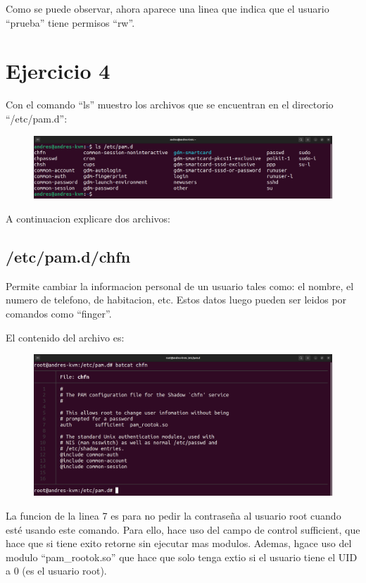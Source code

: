 \documentclass{article}
\begin{document}
Como se puede observar, ahora aparece una linea que indica que el usuario ``prueba'' tiene permisos ``rw''.


\section{Ejercicio 4}
Con el comando ``ls'' muestro los archivos que se encuentran en el directorio ``/etc/pam.d'':

\begin{figure}[H]
    \includegraphics[width=\textwidth]{imagenes/lspam.png}
\end{figure}

A continuacion explicare dos archivos:

\subsection{/etc/pam.d/chfn}
Permite cambiar la informacion personal de un usuario tales como: el nombre, el numero de telefono, de habitacion, etc. Estos datos luego pueden ser leidos por comandos como ``finger''.

El contenido del archivo es:

\begin{figure}[H]
    \includegraphics[width=\textwidth]{imagenes/pamchfn.png}
\end{figure}

La funcion de la linea 7 es para no pedir la contraseña al usuario root cuando esté usando este comando. Para ello, hace uso del campo de control sufficient, que hace que si tiene exito retorne sin ejecutar mas modulos. Ademas, hgace uso del modulo ``pam\_rootok.so'' que hace que solo tenga extio si el usuario tiene el UID a 0 (es el usuario root).
\end{document}
